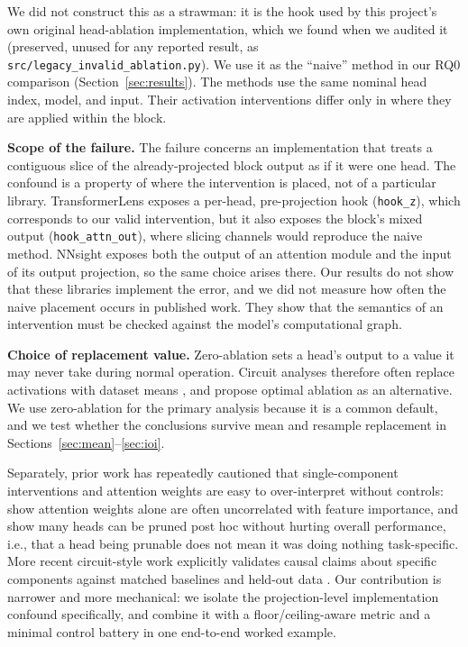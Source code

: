 \documentclass{article}
\begin{document}
We did not construct this as a strawman: it is the hook used by
this project's own original head-ablation implementation, which we
found when we audited it (preserved, unused for any reported result, as
\texttt{src/legacy\_invalid\_ablation.py}). We use it as
the ``naive'' method in our RQ0 comparison (Section~\ref{sec:results}).
The methods use the same nominal head index, model, and input. Their
activation interventions differ only in where they are applied within
the block.

\textbf{Scope of the failure.} The failure concerns an implementation
that treats a contiguous slice of the already-projected block output as
if it were one head. The confound is a property of where the
intervention is placed, not of a particular library. TransformerLens
\citep{nanda2022transformerlens} exposes a per-head, pre-projection hook
(\texttt{hook\_z}), which corresponds to our valid intervention, but it
also exposes the block's mixed output (\texttt{hook\_attn\_out}), where
slicing channels would reproduce the naive method. NNsight
\citep{fiottokaufman2025nnsight} exposes both the output of an attention
module and the input of its output projection, so the same choice arises
there. Our results do not show that these libraries implement the error,
and we did not measure how often the naive placement occurs in published
work. They show that the semantics of an intervention must be checked
against the model's computational graph.

\textbf{Choice of replacement value.} Zero-ablation sets a head's output
to a value it may never take during normal operation. Circuit analyses
therefore often replace activations with dataset means
\citep{wang2023interpretability}, and \citet{li2024optimal} propose
optimal ablation as an alternative. We use zero-ablation for the primary
analysis because it is a common default, and we test whether the
conclusions survive mean and resample replacement in
Sections~\ref{sec:mean}--\ref{sec:ioi}.

Separately, prior work has repeatedly cautioned that single-component
interventions and attention weights are easy to over-interpret without
controls: \citet{jain2019attention} show attention
weights alone are often uncorrelated with feature importance, and
\citet{michel2019sixteen} show many heads can be pruned
post hoc without hurting overall performance, i.e., that a head being
prunable does not mean it was doing nothing task-specific. More recent
circuit-style work explicitly validates causal claims about specific
components against matched baselines and held-out data
\citep{meng2022locating,wang2023interpretability,conmy2023towards}. Our contribution is
narrower and more mechanical: we isolate the projection-level
implementation confound specifically, and combine it with a
floor/ceiling-aware metric and a minimal control battery in one
end-to-end worked example.
\end{document}
